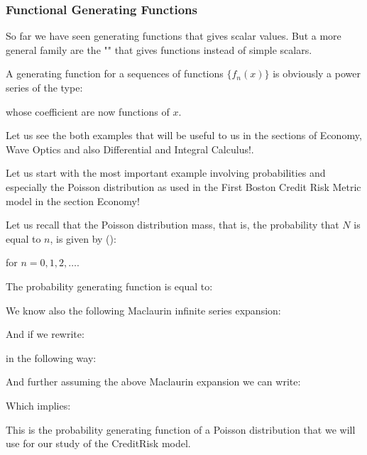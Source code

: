 	\subsubsection{Functional Generating Functions}
	So far we have seen generating functions that gives scalar values. But a more general family are the "\label{functional generating function}" that gives functions instead of simple scalars.
	
	A generating function for a sequences of functions $\{f_n(x)\}$ is obviously a power series of the type:
	
	whose coefficient are now functions of $x$.
	
	Let us see the both examples that will be useful to us in the sections of Economy, Wave Optics and also Differential and Integral Calculus!.
	
	Let us start with the most important example involving probabilities and especially the Poisson distribution as used in the First Boston Credit Risk Metric model in the section Economy!
	
	Let us recall that the Poisson distribution mass, that is, the probability that $N$ is equal to $n$, is given by ():
	
	for $n=0,1,2,\ldots$.

	The probability generating function is equal to:
	
	We know also the following Maclaurin infinite series expansion:
	
	And if we rewrite:
	
	in the following way:
	
	And further assuming the above Maclaurin expansion we can write:
	
	Which implies:
	
	This is the probability generating function of a Poisson distribution that we will use for our study of the CreditRisk model.
	
